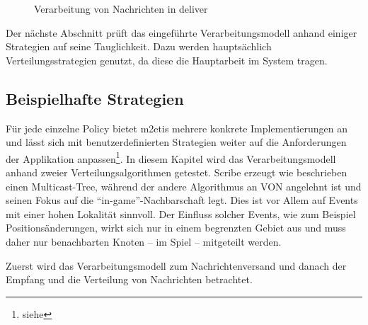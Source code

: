 \begin{figure}[htbp]
\centering
{}
\caption{Verarbeitung von Nachrichten in deliver}
\label{fig:processing_deliver}
\end{figure}

Der nächste Abschnitt prüft das eingeführte Verarbeitungsmodell anhand einiger Strategien auf seine Tauglichkeit. Dazu werden hauptsächlich Verteilungsstrategien genutzt, da diese die Hauptarbeit im System tragen.

\subsection*{Beispielhafte Strategien}
Für jede einzelne Policy bietet \ac{m2etis} mehrere konkrete Implementierungen an und lässt sich mit benutzerdefinierten Strategien weiter auf die Anforderungen der Applikation anpassen\footnote{siehe }. In diesem Kapitel wird das Verarbeitungsmodell anhand zweier Verteilungsalgorithmen getestet. Scribe \cite{Castro2002Scribe} erzeugt wie beschrieben einen Multicast-Tree, während der andere Algorithmus an VON \cite{Hu2006VON} angelehnt ist und seinen Fokus auf die ``in-game''-Nachbarschaft legt. Dies ist vor Allem auf Events mit einer hohen Lokalität sinnvoll. Der Einfluss solcher Events, wie zum Beispiel Positionsänderungen, wirkt sich nur in einem begrenzten Gebiet aus und muss daher nur benachbarten Knoten -- im Spiel -- mitgeteilt werden.

Zuerst wird das Verarbeitungsmodell zum Nachrichtenversand und danach der Empfang und die Verteilung von Nachrichten betrachtet.

